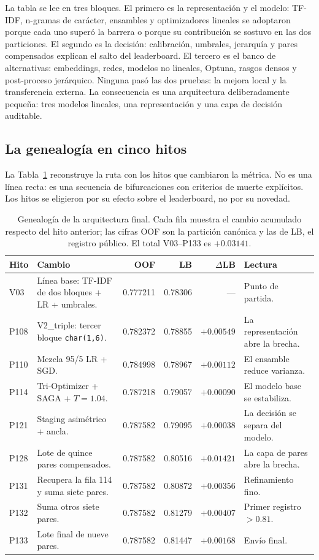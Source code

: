 La tabla se lee en tres bloques. El primero es la representación y el modelo:
TF-IDF, n-gramas de carácter, ensambles y optimizadores lineales se adoptaron
porque cada uno superó la barrera o porque su contribución se sostuvo en las
dos particiones. El segundo es la decisión: calibración, umbrales, jerarquía y
pares compensados explican el salto del leaderboard. El tercero es el banco de
alternativas: embeddings, redes, modelos no lineales, Optuna, rasgos densos y
post-proceso jerárquico. Ninguna pasó las dos pruebas: la mejora local y la
transferencia externa. La consecuencia es una arquitectura deliberadamente
pequeña: tres modelos lineales, una representación y una capa de decisión
auditable.

\subsection{La genealogía en cinco hitos}

La Tabla~\ref{tab:ruta} reconstruye la ruta con los hitos que cambiaron la
métrica. No es una línea recta: es una secuencia de bifurcaciones con criterios
de muerte explícitos. Los hitos se eligieron por su efecto sobre el
leaderboard, no por su novedad.

\begin{table}[t]
\centering
\caption{Genealogía de la arquitectura final. Cada fila muestra el cambio
acumulado respecto del hito anterior; las cifras OOF son la partición
canónica y las de LB, el registro público. El total V03--P133 es $+0.03141$.}
\label{tab:ruta}
\scriptsize
\begin{tabularx}{\textwidth}{@{}l>{\raggedright\arraybackslash}p{3.0cm}rrr>{\raggedright\arraybackslash}X@{}}
\toprule
Hito & Cambio & OOF & LB & $\Delta$LB & Lectura \\
\midrule
V03 & Línea base: TF-IDF de dos bloques + LR + umbrales. & 0.777211 & 0.78306 & --- & Punto de partida. \\
P108 & V2\_triple: tercer bloque \texttt{char(1,6)}. & 0.782372 & 0.78855 & $+0.00549$ & La representación abre la brecha. \\
P110 & Mezcla 95/5 LR + SGD. & 0.784998 & 0.78967 & $+0.00112$ & El ensamble reduce varianza. \\
P114 & Tri-Optimizer + SAGA + $T=1.04$. & 0.787218 & 0.79057 & $+0.00090$ & El modelo base se estabiliza. \\
P121 & Staging asimétrico + ancla. & 0.787582 & 0.79095 & $+0.00038$ & La decisión se separa del modelo. \\
P128 & Lote de quince pares compensados. & 0.787582 & 0.80516 & $+0.01421$ & La capa de pares abre la brecha. \\
P131 & Recupera la fila 114 y suma siete pares. & 0.787582 & 0.80872 & $+0.00356$ & Refinamiento fino. \\
P132 & Suma otros siete pares. & 0.787582 & 0.81279 & $+0.00407$ & Primer registro $>0.81$. \\
P133 & Lote final de nueve pares. & 0.787582 & 0.81447 & $+0.00168$ & Envío final. \\
\bottomrule
\end{tabularx}
\end{table}

